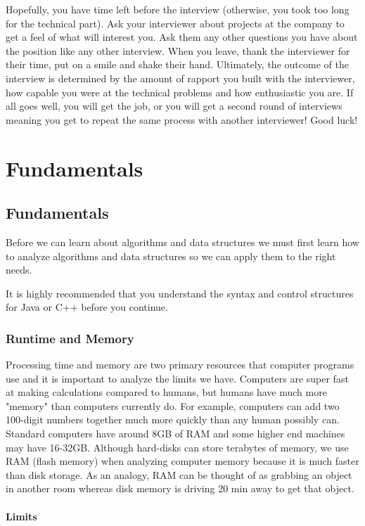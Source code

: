 \documentclass[11pt,oneside]{book}
\begin{document}
Hopefully, you have time left before the interview (otherwise, you took too long for the technical part). Ask your interviewer about projects at the company to get a feel of what will interest you. Ask them any other questions you have about the position like any other interview. When you leave, thank the interviewer for their time, put on a smile and shake their hand. Ultimately, the outcome of the interview is determined by the amount of rapport you built with the interviewer, how capable you were at the technical problems and how enthusiastic you are. If all goes well, you will get the job, or you will get a second round of interviews meaning you get to repeat the same process with another interviewer! Good luck!

\part{ Fundamentals }
    \chapter{ Fundamentals }
        

Before we can learn about algorithms and data structures we must first learn how to analyze algorithms and data structures so we can apply them to the right needs.

It is highly recommended that you understand the syntax and control structures for Java or C++ before you continue.


        \section{ Runtime and Memory }
        

Processing time and memory are two primary resources that computer programs use and it is important to analyze the limits we have. Computers are super fast at making calculations compared to humans, but humans have much more "memory" than computers currently do. For example, computers can add two 100-digit numbers together much more quickly than any human possibly can. Standard computers have around 8GB of RAM and some higher end machines may have 16-32GB. Although hard-disks can store terabytes of memory, we use RAM (flash memory) when analyzing computer memory because it is much faster than disk storage. As an analogy, RAM can be thought of as grabbing an object in another room whereas disk memory is driving 20 min away to get that object.

\subsection{Limits}
\end{document}
